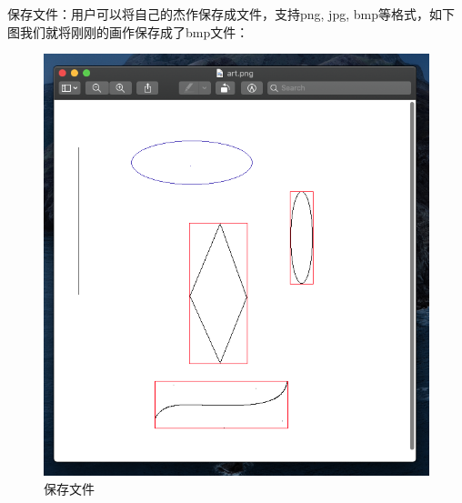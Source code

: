 \documentclass[11pt, a4paper, UTF8]{ctexart}
\begin{document}
保存文件：用户可以将自己的杰作保存成文件，支持png, jpg, bmp等格式，如下图我们就将刚刚的画作保存成了bmp文件：

\begin{figure}[H]
    \centering
    \includegraphics[scale=0.4]{save.png}
    \caption{保存文件}
\end{figure}



















\end{document}
